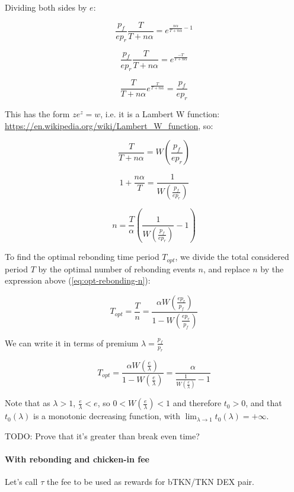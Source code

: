 \documentclass{article}
\begin{document}
Dividing both sides by $e$:

\[
\frac{p_f}{e p_r} \frac{T}{T+n\alpha} = e^{\frac{n\alpha}{T+n\alpha} - 1}
\]

\[
\frac{p_f}{e p_r} \frac{T}{T+n\alpha} = e^{\frac{-T}{T+n\alpha}}
\]

\[
\frac{T}{T+n\alpha} e^{\frac{T}{T+n\alpha}} = \frac{p_f}{e p_r} 
\]

This has the form $z e^z = w$, i.e. it is a Lambert W function: \url{https://en.wikipedia.org/wiki/Lambert_W_function}, so:

\[
\frac{T}{T+n\alpha} = W\left(\frac{p_f}{e p_r} \right)
\]

\[
1 + \frac{n\alpha}{T} = \frac{1}{W\left(\frac{p_f}{e p_r} \right)}
\]

\begin{equation}
  \label{eq:opt-rebonding-n}
n = \frac{T}{\alpha} \left(\frac{1}{W\left(\frac{p_f}{e p_r} \right)} - 1\right)
\end{equation}

To find the optimal rebonding time period $T_{opt}$, we divide the total considered period $T$ by the optimal number of rebonding events $n$, and replace $n$ by the expression above (\ref{eq:opt-rebonding-n}):

\begin{equation}
  \label{}
T_{opt} = \frac{T}{n} = \frac{\alpha W\left(\frac{e p_r}{p_f}\right)}{1 - W\left(\frac{e p_r}{p_f}\right)}
\end{equation}

We can write it in terms of premium $\lambda = \frac{p_f}{p_r}$

\begin{equation}
  \label{eq:opt-rebonding}
T_{opt} = \frac{\alpha W\left(\frac{e}{\lambda}\right)}{1 - W\left(\frac{e}{\lambda}\right)} = \frac{\alpha}{\frac{1}{W\left(\frac{e}{\lambda}\right)} - 1}
\end{equation}

Note that as $\lambda > 1$, $\frac{e}{\lambda} < e$, so $0 < W(\frac{e}{\lambda}) < 1$ and therefore $t_0 > 0$, and that $t_0(\lambda)$ is a monotonic decreasing function, with $\lim_{\lambda \rightarrow 1}t_0(\lambda) = +\infty$.


TODO: Prove that it’s greater than break even time?

\paragraph{With rebonding and chicken-in fee}
Let’s call $\tau$ the fee to be used as rewards for bTKN/TKN DEX pair.
\end{document}
